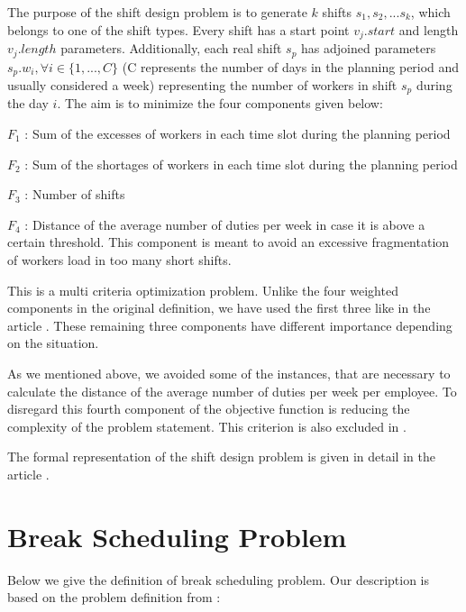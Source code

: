 The purpose of the shift design problem is to generate $k$ shifts $s_1, s_2,...s_k$, which belongs to one of the shift types. Every shift has a start point $v_j.start$ and length $v_j.length$ parameters.  Additionally, each real shift $s_p$ has adjoined parameters $s_p.w_i, \forall i \in \{1,...,C\}$ (C represents the number of days in the planning period and usually considered a week) representing the number of workers in shift $s_p$ during the day $i$. The aim is to minimize the four components given below:

$F_1$ : Sum of the excesses of workers in each time slot during the planning period

$F_2$ : Sum of the shortages of workers in each time slot during the planning period

$F_3$ : Number of shifts

$F_4$ : Distance of the average number of duties per week in case it is above a certain threshold. This component is meant to avoid an excessive fragmentation of workers load in too many short shifts.

This is a multi criteria optimization problem. Unlike the four weighted components in the original definition, we have used the first three like in the article \cite{li:2007:gaspero}. These remaining three components have different importance depending on the situation. 

As we mentioned above, we avoided some of the instances, that are necessary to calculate the distance of the average number of duties per week per employee. To disregard this fourth component of the objective function is reducing the complexity of the problem statement. This criterion is also excluded in \cite{li:2007:gaspero}.

The formal representation of the shift design problem is given in detail in the article \cite{li:2001:gärtner} \cite{li:2004:musliu}.

\section{Break Scheduling Problem}

Below we give the definition of break scheduling problem. Our description is based on the problem definition from \cite{li:2010:beer}:

